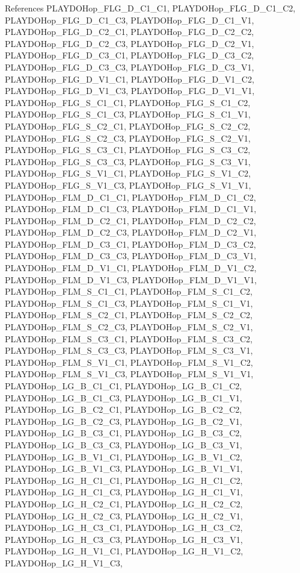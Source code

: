 References PLAYDOHop\_\-FLG\_\-D\_\-C1\_\-C1, PLAYDOHop\_\-FLG\_\-D\_\-C1\_\-C2, PLAYDOHop\_\-FLG\_\-D\_\-C1\_\-C3, PLAYDOHop\_\-FLG\_\-D\_\-C1\_\-V1, PLAYDOHop\_\-FLG\_\-D\_\-C2\_\-C1, PLAYDOHop\_\-FLG\_\-D\_\-C2\_\-C2, PLAYDOHop\_\-FLG\_\-D\_\-C2\_\-C3, PLAYDOHop\_\-FLG\_\-D\_\-C2\_\-V1, PLAYDOHop\_\-FLG\_\-D\_\-C3\_\-C1, PLAYDOHop\_\-FLG\_\-D\_\-C3\_\-C2, PLAYDOHop\_\-FLG\_\-D\_\-C3\_\-C3, PLAYDOHop\_\-FLG\_\-D\_\-C3\_\-V1, PLAYDOHop\_\-FLG\_\-D\_\-V1\_\-C1, PLAYDOHop\_\-FLG\_\-D\_\-V1\_\-C2, PLAYDOHop\_\-FLG\_\-D\_\-V1\_\-C3, PLAYDOHop\_\-FLG\_\-D\_\-V1\_\-V1, PLAYDOHop\_\-FLG\_\-S\_\-C1\_\-C1, PLAYDOHop\_\-FLG\_\-S\_\-C1\_\-C2, PLAYDOHop\_\-FLG\_\-S\_\-C1\_\-C3, PLAYDOHop\_\-FLG\_\-S\_\-C1\_\-V1, PLAYDOHop\_\-FLG\_\-S\_\-C2\_\-C1, PLAYDOHop\_\-FLG\_\-S\_\-C2\_\-C2, PLAYDOHop\_\-FLG\_\-S\_\-C2\_\-C3, PLAYDOHop\_\-FLG\_\-S\_\-C2\_\-V1, PLAYDOHop\_\-FLG\_\-S\_\-C3\_\-C1, PLAYDOHop\_\-FLG\_\-S\_\-C3\_\-C2, PLAYDOHop\_\-FLG\_\-S\_\-C3\_\-C3, PLAYDOHop\_\-FLG\_\-S\_\-C3\_\-V1, PLAYDOHop\_\-FLG\_\-S\_\-V1\_\-C1, PLAYDOHop\_\-FLG\_\-S\_\-V1\_\-C2, PLAYDOHop\_\-FLG\_\-S\_\-V1\_\-C3, PLAYDOHop\_\-FLG\_\-S\_\-V1\_\-V1, PLAYDOHop\_\-FLM\_\-D\_\-C1\_\-C1, PLAYDOHop\_\-FLM\_\-D\_\-C1\_\-C2, PLAYDOHop\_\-FLM\_\-D\_\-C1\_\-C3, PLAYDOHop\_\-FLM\_\-D\_\-C1\_\-V1, PLAYDOHop\_\-FLM\_\-D\_\-C2\_\-C1, PLAYDOHop\_\-FLM\_\-D\_\-C2\_\-C2, PLAYDOHop\_\-FLM\_\-D\_\-C2\_\-C3, PLAYDOHop\_\-FLM\_\-D\_\-C2\_\-V1, PLAYDOHop\_\-FLM\_\-D\_\-C3\_\-C1, PLAYDOHop\_\-FLM\_\-D\_\-C3\_\-C2, PLAYDOHop\_\-FLM\_\-D\_\-C3\_\-C3, PLAYDOHop\_\-FLM\_\-D\_\-C3\_\-V1, PLAYDOHop\_\-FLM\_\-D\_\-V1\_\-C1, PLAYDOHop\_\-FLM\_\-D\_\-V1\_\-C2, PLAYDOHop\_\-FLM\_\-D\_\-V1\_\-C3, PLAYDOHop\_\-FLM\_\-D\_\-V1\_\-V1, PLAYDOHop\_\-FLM\_\-S\_\-C1\_\-C1, PLAYDOHop\_\-FLM\_\-S\_\-C1\_\-C2, PLAYDOHop\_\-FLM\_\-S\_\-C1\_\-C3, PLAYDOHop\_\-FLM\_\-S\_\-C1\_\-V1, PLAYDOHop\_\-FLM\_\-S\_\-C2\_\-C1, PLAYDOHop\_\-FLM\_\-S\_\-C2\_\-C2, PLAYDOHop\_\-FLM\_\-S\_\-C2\_\-C3, PLAYDOHop\_\-FLM\_\-S\_\-C2\_\-V1, PLAYDOHop\_\-FLM\_\-S\_\-C3\_\-C1, PLAYDOHop\_\-FLM\_\-S\_\-C3\_\-C2, PLAYDOHop\_\-FLM\_\-S\_\-C3\_\-C3, PLAYDOHop\_\-FLM\_\-S\_\-C3\_\-V1, PLAYDOHop\_\-FLM\_\-S\_\-V1\_\-C1, PLAYDOHop\_\-FLM\_\-S\_\-V1\_\-C2, PLAYDOHop\_\-FLM\_\-S\_\-V1\_\-C3, PLAYDOHop\_\-FLM\_\-S\_\-V1\_\-V1, PLAYDOHop\_\-LG\_\-B\_\-C1\_\-C1, PLAYDOHop\_\-LG\_\-B\_\-C1\_\-C2, PLAYDOHop\_\-LG\_\-B\_\-C1\_\-C3, PLAYDOHop\_\-LG\_\-B\_\-C1\_\-V1, PLAYDOHop\_\-LG\_\-B\_\-C2\_\-C1, PLAYDOHop\_\-LG\_\-B\_\-C2\_\-C2, PLAYDOHop\_\-LG\_\-B\_\-C2\_\-C3, PLAYDOHop\_\-LG\_\-B\_\-C2\_\-V1, PLAYDOHop\_\-LG\_\-B\_\-C3\_\-C1, PLAYDOHop\_\-LG\_\-B\_\-C3\_\-C2, PLAYDOHop\_\-LG\_\-B\_\-C3\_\-C3, PLAYDOHop\_\-LG\_\-B\_\-C3\_\-V1, PLAYDOHop\_\-LG\_\-B\_\-V1\_\-C1, PLAYDOHop\_\-LG\_\-B\_\-V1\_\-C2, PLAYDOHop\_\-LG\_\-B\_\-V1\_\-C3, PLAYDOHop\_\-LG\_\-B\_\-V1\_\-V1, PLAYDOHop\_\-LG\_\-H\_\-C1\_\-C1, PLAYDOHop\_\-LG\_\-H\_\-C1\_\-C2, PLAYDOHop\_\-LG\_\-H\_\-C1\_\-C3, PLAYDOHop\_\-LG\_\-H\_\-C1\_\-V1, PLAYDOHop\_\-LG\_\-H\_\-C2\_\-C1, PLAYDOHop\_\-LG\_\-H\_\-C2\_\-C2, PLAYDOHop\_\-LG\_\-H\_\-C2\_\-C3, PLAYDOHop\_\-LG\_\-H\_\-C2\_\-V1, PLAYDOHop\_\-LG\_\-H\_\-C3\_\-C1, PLAYDOHop\_\-LG\_\-H\_\-C3\_\-C2, PLAYDOHop\_\-LG\_\-H\_\-C3\_\-C3, PLAYDOHop\_\-LG\_\-H\_\-C3\_\-V1, PLAYDOHop\_\-LG\_\-H\_\-V1\_\-C1, PLAYDOHop\_\-LG\_\-H\_\-V1\_\-C2, PLAYDOHop\_\-LG\_\-H\_\-V1\_\-C3, 